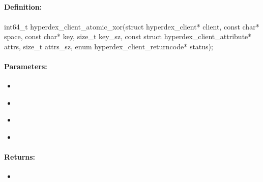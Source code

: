 \pagebreak
\subsection{}
\label{api:c:atomic_xor}


\paragraph{Definition:}
\begin{ccode}
int64_t hyperdex_client_atomic_xor(struct hyperdex_client* client,
        const char* space,
        const char* key, size_t key_sz,
        const struct hyperdex_client_attribute* attrs, size_t attrs_sz,
        enum hyperdex_client_returncode* status);
\end{ccode}

\paragraph{Parameters:}
\begin{itemize}[noitemsep]
\item {}\\

\item {}\\

\item {}\\

\item {}\\

\end{itemize}

\paragraph{Returns:}
\begin{itemize}[noitemsep]
\item {}\\

\end{itemize}

